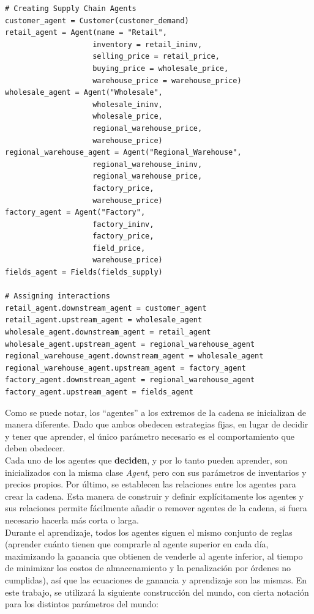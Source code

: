 \begin{verbatim}
# Creating Supply Chain Agents
customer_agent = Customer(customer_demand)
retail_agent = Agent(name = "Retail", 
                    inventory = retail_ininv,
                    selling_price = retail_price,
                    buying_price = wholesale_price,
                    warehouse_price = warehouse_price)
wholesale_agent = Agent("Wholesale", 
                    wholesale_ininv, 
                    wholesale_price,
                    regional_warehouse_price,
                    warehouse_price)
regional_warehouse_agent = Agent("Regional_Warehouse", 
                    regional_warehouse_ininv, 
                    regional_warehouse_price,
                    factory_price, 
                    warehouse_price)
factory_agent = Agent("Factory",
                    factory_ininv,
                    factory_price,
                    field_price,
                    warehouse_price)
fields_agent = Fields(fields_supply)

# Assigning interactions
retail_agent.downstream_agent = customer_agent
retail_agent.upstream_agent = wholesale_agent
wholesale_agent.downstream_agent = retail_agent
wholesale_agent.upstream_agent = regional_warehouse_agent
regional_warehouse_agent.downstream_agent = wholesale_agent
regional_warehouse_agent.upstream_agent = factory_agent
factory_agent.downstream_agent = regional_warehouse_agent
factory_agent.upstream_agent = fields_agent

\end{verbatim}

Como se puede notar, los ``agentes'' a los extremos de la cadena se inicializan de manera diferente. Dado que ambos obedecen estrategias fijas, en lugar de decidir y tener que aprender, el \'unico par\'ametro necesario es el comportamiento que deben obedecer.\\

Cada uno de los agentes que \textbf{deciden}, y por lo tanto pueden aprender, son inicializados con la misma clase \textit{Agent}, pero con sus par\'ametros de inventarios y precios propios. Por \'ultimo, se establecen las relaciones entre los agentes para crear la cadena. Esta manera de construir y definir expl\'icitamente los agentes y sus relaciones permite f\'acilmente a\~nadir o remover agentes de la cadena, si fuera necesario hacerla m\'as corta o larga.\\

Durante el aprendizaje, todos los agentes siguen el mismo conjunto de reglas (aprender cu\'anto tienen que comprarle al agente superior en cada d\'ia, maximizando la ganancia que obtienen de venderle al agente inferior, al tiempo de minimizar los costos de almacenamiento y la penalizaci\'on por \'ordenes no cumplidas), as\'i que las ecuaciones de ganancia y aprendizaje son las mismas. En este trabajo, se utilizar\'a la siguiente construcci\'on del mundo, con cierta notaci\'on para los distintos par\'ametros del mundo:

